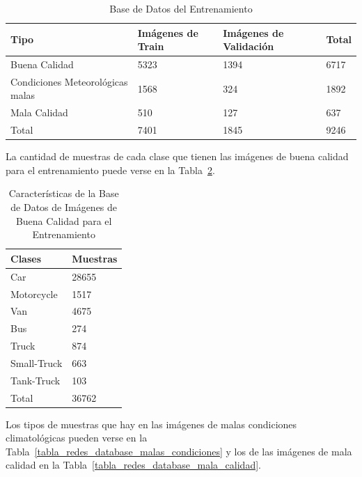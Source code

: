 \begin{table}[H]
\begin{center}
\begin{tabular}{|l|l|l|l|}
\hline
Tipo  & Imágenes de Train & Imágenes de Validación & Total \\
\hline \hline
Buena Calidad & 5323 &  1394 & 6717 \\ \hline
Condiciones Meteorológicas malas & 1568 & 324 & 1892 \\ \hline
Mala Calidad & 510 & 127 & 637 \\ \hline
Total & 7401 & 1845 & 9246 \\ \hline
\end{tabular}
\caption{Base de Datos del Entrenamiento}
\label{base_datos_final_train}
\end{center}
\end{table}

La cantidad de muestras de cada clase que tienen las imágenes de buena calidad para el entrenamiento puede verse en la Tabla~\ref{tabla_redes_database_mayor}. 

\begin{table}[H]
\begin{center}
\begin{tabular}{|l|l|}
\hline
Clases & Muestras \\
\hline \hline
Car & 28655 \\ \hline
Motorcycle & 1517 \\ \hline
Van & 4675 \\ \hline
Bus & 274 \\ \hline
Truck & 874 \\ \hline
Small-Truck & 663 \\ \hline
Tank-Truck & 103 \\ \hline
Total & 36762 \\ \hline
\end{tabular}
\caption{Características de la Base de Datos de Imágenes de Buena Calidad para el Entrenamiento}
\label{tabla_redes_database_mayor}
\end{center}
\end{table}

Los tipos de muestras que hay en las imágenes de malas condiciones climatológicas pueden verse en la Tabla~\ref{tabla_redes_database_malas_condiciones} y los de las imágenes de mala calidad en la Tabla~\ref{tabla_redes_database_mala_calidad}.

